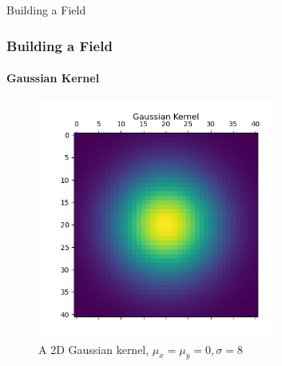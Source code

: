\documentclass[professionalfont,10pt]{beamer}
\begin{document}
	\begin{frame}[t]{Building a Field}
		\frametitle{Building a Field}
		\framesubtitle{Gaussian Kernel}
		\hskip-0.75cm
		\begin{minipage}[t]{0.2\linewidth}\vspace{-0.5cm}
			\tiny\tableofcontents[currentsection,currentsubsection,hideothersubsections,subsectionstyle=show/shaded]
		\end{minipage}
		\hfill%
		\begin{minipage}[t]{0.86\linewidth}\vspace{-0.5cm}
			\begin{figure}[t]
				\centering
				\captionsetup{width=0.9\textwidth}
				\includegraphics[width=0.7\textwidth]{../images/GaussianKernel.png}
				\caption{A 2D Gaussian kernel, $\mu_x = \mu_y = 0, \sigma = 8$}
				\label{CFandEncoder}
			\end{figure}
		\end{minipage}
		\vfill%
	\end{frame}
	
\end{document}
